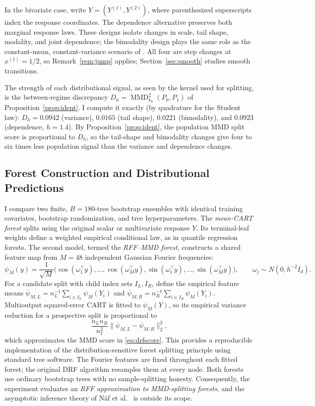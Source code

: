 \documentclass[12pt,a4paper]{article}
\newcommand{\MMD}{\operatorname{MMD}}
\newcommand{\1}{\mathbf 1}
\begin{document}
In the bivariate case, write $Y=(Y^{(1)},Y^{(2)})$, where parenthesized superscripts index the response coordinates. The dependence alternative preserves both marginal response laws. These designs isolate changes in scale, tail shape, modality, and joint dependence; the bimodality design plays the same role as the constant-mean, constant-variance scenario of \cite[Section~4.2]{cevid2022}. All four are step changes at $x^{(1)}=1/2$, so Remark~\ref{rem:jump} applies; Section~\ref{sec:smooth} studies smooth transitions.

The strength of each distributional signal, as seen by the kernel used for splitting, is the between-regime discrepancy $D_h=\MMD_{k_h}^2(P_0,P_1)$ of Proposition~\ref{prop:ident}. I compute it exactly (by quadrature for the Student law): $D_h=0.0942$ (variance), $0.0165$ (tail shape), $0.0221$ (bimodality), and $0.0923$ (dependence, $h=1.4$). By Proposition~\ref{prop:ident}, the population MMD split score is proportional to $D_h$, so the tail-shape and bimodality changes give four to six times less population signal than the variance and dependence changes.

\subsection{Forest Construction and Distributional Predictions}
I compare two finite, $B=180$-tree bootstrap ensembles with identical training covariates, bootstrap randomization, and tree hyperparameters. The \emph{mean-CART forest} splits using the original scalar or multivariate response $Y$. Its terminal-leaf weights define a weighted empirical conditional law, as in quantile regression forests. The second model, termed the \emph{RFF--MMD forest}, constructs a shared feature map from $M=48$ independent Gaussian Fourier frequencies:
\begin{equation}\label{eq:fffeatures}
 \psi_M(y)=\frac1{\sqrt M}\bigl(
 \cos(\omega_1^\top y),\ldots,\cos(\omega_M^\top y),
 \sin(\omega_1^\top y),\ldots,\sin(\omega_M^\top y)\bigr),\qquad
 \omega_j\sim N(0,h^{-2}I_d).
\end{equation}
For a candidate split with child index sets $I_L,I_R$, define the empirical feature means $\overline\psi_{M,L}=n_L^{-1}\sum_{i\in I_L}\psi_M(Y_i)$ and $\overline\psi_{M,R}=n_R^{-1}\sum_{i\in I_R}\psi_M(Y_i)$. Multioutput squared-error CART is fitted to $\psi_M(Y)$, so its empirical variance reduction for a prospective split is proportional to
\[
 \frac{n_Ln_R}{n_I^2}\bigl\|\overline\psi_{M,L}-\overline\psi_{M,R}\bigr\|_2^2,
\]
which approximates the MMD score in \eqref{eq:drfscore}. This provides a reproducible implementation of the distribution-sensitive forest splitting principle using standard tree software. The Fourier features are fixed throughout each fitted forest; the original DRF algorithm resamples them at every node. Both forests use ordinary bootstrap trees with no sample-splitting honesty. Consequently, the experiment evaluates an \emph{RFF approximation to MMD-splitting forests}, and the asymptotic inference theory of N\"af et al.\ \cite{naf2023} is outside its scope.
\end{document}
